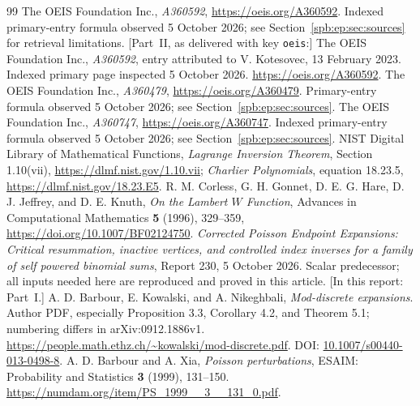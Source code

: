 \documentclass[11pt,letterpaper]{article}
\numberwithin{equation}{section}
\theoremstyle{definition}\newtheorem{definition}[theorem]{Definition}
\theoremstyle{remark}\newtheorem{remark}[theorem]{Remark}
\newcommand{\1}{\mathbf 1}
\begin{document}








\appendix{}

\begin{thebibliography}{99}
 The OEIS Foundation Inc., \emph{A360592},
\url{https://oeis.org/A360592}. Indexed primary-entry formula observed 5 October 2026;
see Section~\ref{spb:ep:sec:sources} for retrieval limitations.
[Part~II, as delivered with key \texttt{oeis}:] The OEIS Foundation Inc., \emph{A360592}, entry attributed to V. Kotesovec, 13 February 2023. Indexed primary page inspected 5 October 2026. \url{https://oeis.org/A360592}.
 The OEIS Foundation Inc., \emph{A360479},
\url{https://oeis.org/A360479}. Primary-entry formula observed 5 October 2026;
see Section~\ref{spb:ep:sec:sources}.
 The OEIS Foundation Inc., \emph{A360747},
\url{https://oeis.org/A360747}. Indexed primary-entry formula observed 5 October 2026;
see Section~\ref{spb:ep:sec:sources}.
 NIST Digital Library of Mathematical Functions,
\emph{Lagrange Inversion Theorem}, Section 1.10(vii),
\url{https://dlmf.nist.gov/1.10.vii};
\emph{Charlier Polynomials}, equation 18.23.5,
\url{https://dlmf.nist.gov/18.23.E5}.
 R. M. Corless, G. H. Gonnet, D. E. G. Hare,
D. J. Jeffrey, and D. E. Knuth, \emph{On the Lambert $W$ Function},
Advances in Computational Mathematics \textbf{5} (1996), 329--359,
\url{https://doi.org/10.1007/BF02124750}.
 \emph{Corrected Poisson Endpoint Expansions: Critical resummation, inactive vertices, and controlled index inverses for a family of self powered binomial sums}, Report 230, 5 October 2026. Scalar predecessor; all inputs needed here are reproduced and proved in this article.
[In this report: Part~I.]
 A. D. Barbour, E. Kowalski, and A. Nikeghbali, \emph{Mod-discrete expansions}. Author PDF, especially Proposition 3.3, Corollary 4.2, and Theorem 5.1; numbering differs in arXiv:0912.1886v1. \url{https://people.math.ethz.ch/~kowalski/mod-discrete.pdf}. DOI: \href{https://doi.org/10.1007/s00440-013-0498-8}{10.1007/s00440-013-0498-8}.
 A. D. Barbour and A. Xia, \emph{Poisson perturbations}, ESAIM: Probability and Statistics \textbf{3} (1999), 131--150. \url{https://numdam.org/item/PS_1999__3__131_0.pdf}.

\end{thebibliography}
\end{document}
